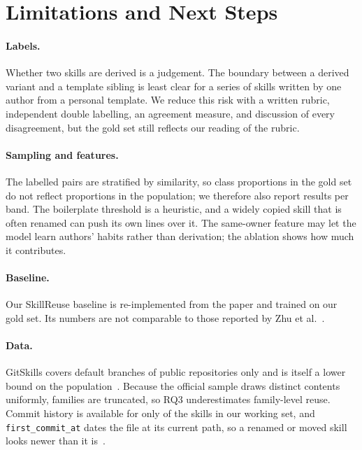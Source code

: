 \section{Limitations and Next Steps}
\label{sec:limitations}

\paragraph{Labels.} Whether two skills are derived is a judgement. The boundary between a
derived variant and a template sibling is least clear for a series of skills written by one
author from a personal template. We reduce this risk with a written rubric, independent double
labelling, an agreement measure, and discussion of every disagreement, but the gold set still
reflects our reading of the rubric.

\paragraph{Sampling and features.} The labelled pairs are stratified by similarity, so class
proportions in the gold set do not reflect proportions in the population; we therefore also
report results per band. The boilerplate threshold is a heuristic, and a widely copied skill
that is often renamed can push its own lines over it. The same-owner feature may let the model
learn authors' habits rather than derivation; the ablation shows how much it contributes.

\paragraph{Baseline.} Our SkillReuse baseline is re-implemented from the paper and trained on
our gold set. Its numbers are not comparable to those reported by Zhu et
al.~\cite{zhu2026skillreuse}.

\paragraph{Data.} GitSkills covers default branches of public repositories only and is
itself a lower bound on the population~\cite{destefanis2027gitskills}. Because the official
sample draws distinct contents uniformly, families are truncated, so RQ3 underestimates
family-level reuse. Commit history is available for only \ResWorkHistory{} of the
\ResWorkContents{} skills in our working set, and \texttt{first\_commit\_at} dates the file at
its current path, so a renamed or moved skill looks newer than it is~\cite{gitskills_sample}.

